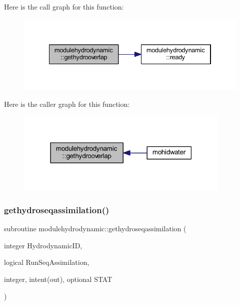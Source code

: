 Here is the call graph for this function\+:\nopagebreak
\begin{figure}[H]
\begin{center}
\leavevmode
\includegraphics[width=334pt]{namespacemodulehydrodynamic_aaf559665e8122ee5d3cf650f45ac04fd_cgraph}
\end{center}
\end{figure}
Here is the caller graph for this function\+:\nopagebreak
\begin{figure}[H]
\begin{center}
\leavevmode
\includegraphics[width=291pt]{namespacemodulehydrodynamic_aaf559665e8122ee5d3cf650f45ac04fd_icgraph}
\end{center}
\end{figure}
\mbox{\label{namespacemodulehydrodynamic_ab2980a48cd10c0f2def3784cbf27608c}} 
\subsubsection{\texorpdfstring{gethydroseqassimilation()}{gethydroseqassimilation()}}
{\footnotesize\ttfamily subroutine modulehydrodynamic\+::gethydroseqassimilation (\begin{DoxyParamCaption}\item[{integer}]{Hydrodynamic\+ID,  }\item[{logical}]{Run\+Seq\+Assimilation,  }\item[{integer, intent(out), optional}]{S\+T\+AT }\end{DoxyParamCaption})\hspace{0.3cm}{\ttfamily [private]}}

